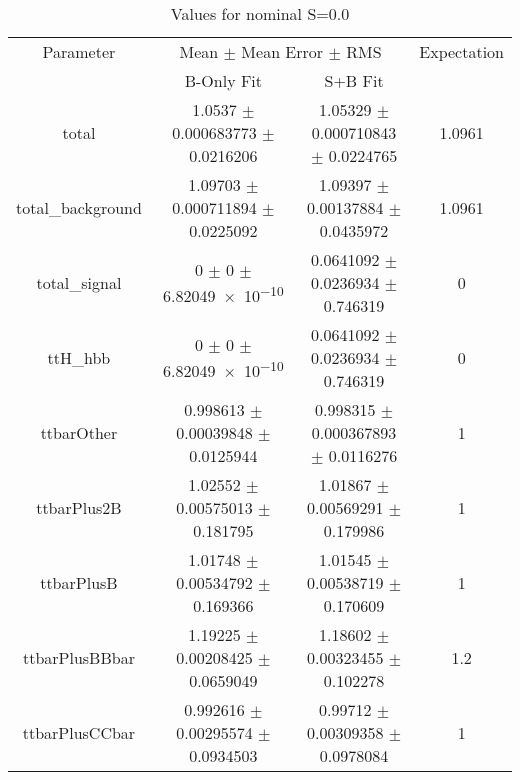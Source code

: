 \begin{table}
\centering
\caption{Values for nominal S=0.0}
\begin{tabular}{cccc}
\toprule
Parameter & \multicolumn{2}{c}{Mean $\pm$ Mean Error $\pm$ RMS} & Expectation\\
 & B-Only Fit & S+B Fit & \\
\midrule
total & \num{1.0537} $\pm$ \num{0.000683773} $\pm$ \num{0.0216206} & \num{1.05329} $\pm$ \num{0.000710843} $\pm$ \num{0.0224765} & \num{1.0961}\\
total\_background & \num{1.09703} $\pm$ \num{0.000711894} $\pm$ \num{0.0225092} & \num{1.09397} $\pm$ \num{0.00137884} $\pm$ \num{0.0435972} & \num{1.0961}\\
total\_signal & \num{0} $\pm$ \num{0} $\pm$ \num{6.82049e-10} & \num{0.0641092} $\pm$ \num{0.0236934} $\pm$ \num{0.746319} & \num{0}\\
ttH\_hbb & \num{0} $\pm$ \num{0} $\pm$ \num{6.82049e-10} & \num{0.0641092} $\pm$ \num{0.0236934} $\pm$ \num{0.746319} & \num{0}\\
ttbarOther & \num{0.998613} $\pm$ \num{0.00039848} $\pm$ \num{0.0125944} & \num{0.998315} $\pm$ \num{0.000367893} $\pm$ \num{0.0116276} & \num{1}\\
ttbarPlus2B & \num{1.02552} $\pm$ \num{0.00575013} $\pm$ \num{0.181795} & \num{1.01867} $\pm$ \num{0.00569291} $\pm$ \num{0.179986} & \num{1}\\
ttbarPlusB & \num{1.01748} $\pm$ \num{0.00534792} $\pm$ \num{0.169366} & \num{1.01545} $\pm$ \num{0.00538719} $\pm$ \num{0.170609} & \num{1}\\
ttbarPlusBBbar & \num{1.19225} $\pm$ \num{0.00208425} $\pm$ \num{0.0659049} & \num{1.18602} $\pm$ \num{0.00323455} $\pm$ \num{0.102278} & \num{1.2}\\
ttbarPlusCCbar & \num{0.992616} $\pm$ \num{0.00295574} $\pm$ \num{0.0934503} & \num{0.99712} $\pm$ \num{0.00309358} $\pm$ \num{0.0978084} & \num{1}\\
\bottomrule
\end{tabular}
\end{table}